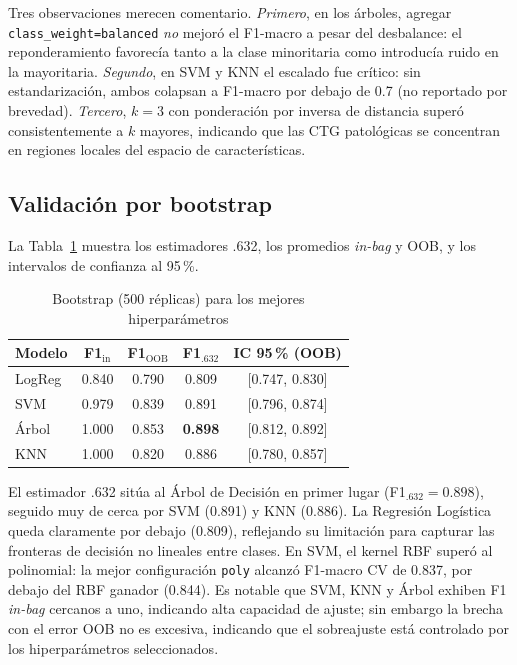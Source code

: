 \documentclass[conference]{IEEEtran}
\begin{document}
Tres observaciones merecen comentario. \emph{Primero}, en los \'arboles, agregar \texttt{class\_weight=balanced} \emph{no} mejor\'o el F1-macro a pesar del desbalance: el reponderamiento favorec\'ia tanto a la clase minoritaria como introduc\'ia ruido en la mayoritaria. \emph{Segundo}, en SVM y KNN el escalado fue cr\'itico: sin estandarizaci\'on, ambos colapsan a F1-macro por debajo de 0.7 (no reportado por brevedad). \emph{Tercero}, $k=3$ con ponderaci\'on por inversa de distancia super\'o consistentemente a $k$ mayores, indicando que las CTG patol\'ogicas se concentran en regiones locales del espacio de caracter\'isticas.

\subsection{Validaci\'on por bootstrap}
La Tabla~\ref{tab:boot} muestra los estimadores .632, los promedios \emph{in-bag} y OOB, y los intervalos de confianza al 95\,\%.

\begin{table}[!t]
\caption{Bootstrap (500 r\'eplicas) para los mejores hiperpar\'ametros}
\label{tab:boot}
\centering
\renewcommand{\arraystretch}{1.2}
\footnotesize
\begin{tabular}{lcccc}
\toprule
\textbf{Modelo} & \textbf{F1$_\text{in}$} & \textbf{F1$_\text{OOB}$} & \textbf{F1$_{.632}$} & \textbf{IC 95\,\% (OOB)} \\
\midrule
LogReg       & 0.840 & 0.790 & 0.809 & [0.747, 0.830] \\
SVM          & 0.979 & 0.839 & 0.891 & [0.796, 0.874] \\
\'Arbol      & 1.000 & 0.853 & \textbf{0.898} & [0.812, 0.892] \\
KNN          & 1.000 & 0.820 & 0.886 & [0.780, 0.857] \\
\bottomrule
\end{tabular}
\end{table}

El estimador .632 sit\'ua al \'Arbol de Decisi\'on en primer lugar (F1$_{.632}=0.898$), seguido muy de cerca por SVM (0.891) y KNN (0.886). La Regresi\'on Log\'istica queda claramente por debajo (0.809), reflejando su limitaci\'on para capturar las fronteras de decisi\'on no lineales entre clases. En SVM, el kernel RBF super\'o al polinomial: la mejor configuraci\'on \texttt{poly} alcanz\'o F1-macro CV de 0.837, por debajo del RBF ganador (0.844). Es notable que SVM, KNN y \'Arbol exhiben F1 \emph{in-bag} cercanos a uno, indicando alta capacidad de ajuste; sin embargo la brecha con el error OOB no es excesiva, indicando que el sobreajuste est\'a controlado por los hiperpar\'ametros seleccionados.
\end{document}
